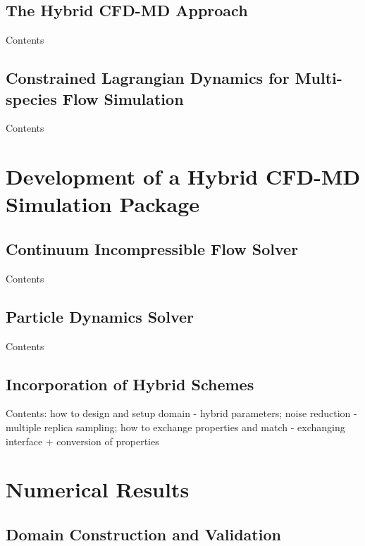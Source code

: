 \documentclass[]{aiaa-tc}%
\begin{document}
\subsection{The Hybrid CFD-MD Approach}
\label{sec:hybrid_design}

Contents

\subsection{Constrained Lagrangian Dynamics for Multi-species Flow Simulation}
\label{sec:hybrid_multispecies}

Contents



\section{Development of a Hybrid CFD-MD Simulation Package}
\label{sec:numerics}

\subsection{Continuum Incompressible Flow Solver}
\label{sec:numerics_cfd}

Contents

\subsection{Particle Dynamics Solver}
\label{sec:numerics_md}

Contents

\subsection{Incorporation of Hybrid Schemes}
\label{sec:numerics_hybrid}

Contents: how to design and setup domain - hybrid parameters; noise reduction - multiple replica sampling; how to exchange properties and match - exchanging interface + conversion of properties



\section{Numerical Results}
\label{sec:result}

\subsection{Domain Construction and Validation}
\label{sec:result_val}
\end{document}
